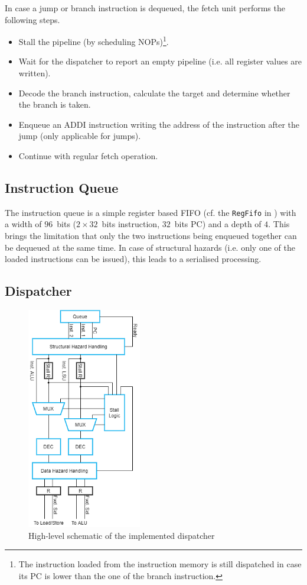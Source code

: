 \documentclass[conference]{IEEEtran}
\begin{document}
In case a jump or branch instruction is dequeued, the fetch unit performs the following steps.
\begin{itemize}
	\item Stall the pipeline (by scheduling NOPs)\footnote{The instruction loaded from the instruction memory is still dispatched in case its PC is lower than the one of the branch instruction.}.
	\item Wait for the dispatcher to report an empty pipeline (i.e. all register values are written).
	\item Decode the branch instruction, calculate the target and determine whether the branch is taken.
	\item Enqueue an ADDI instruction writing the address of the instruction after the jump (only applicable for jumps).
	\item Continue with regular fetch operation.
\end{itemize}

\subsection{Instruction Queue}
The instruction queue is a simple register based FIFO (cf. the \verb|RegFifo| in \cite{schoeberl}) with a width of $96$~bits ($2\times32$~bits instruction, $32$~bits PC) and a depth of $4$. This brings the limitation that only the two instructions being enqueued together can be dequeued at the same time. In case of structural hazards (i.e. only one of the loaded instructions can be issued), this leads to a serialised processing.

\subsection{Dispatcher} \label{sec:dispatch}

\begin{figure}
	\centering
	\includegraphics[width=5cm]{dispatcher.png}
	\caption{High-level schematic of the implemented dispatcher}
	\label{fig:dispatcher}
\end{figure}
\end{document}

